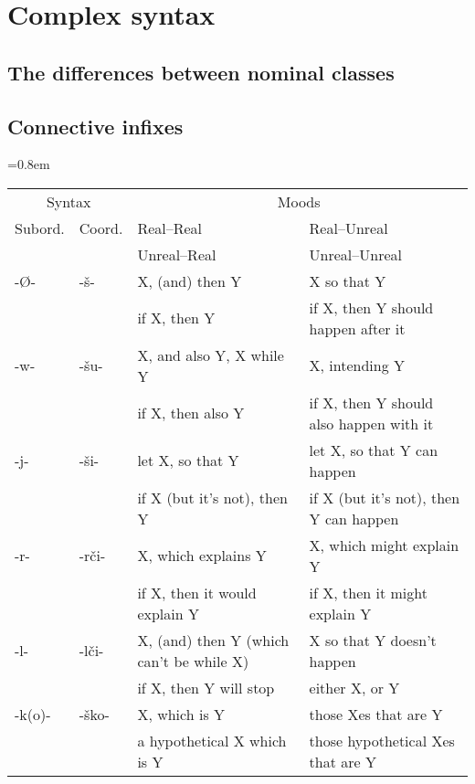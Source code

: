 \chapter{Complex syntax}
\section{The differences between nominal classes}
\section{Connective infixes}
\begingroup
\tabcolsep=0.8em
\begin{tabular}{@{\hskip 0.5em}llll@{\hskip 0.5em}}
  \toprule
  \multicolumn{2}{c}{Syntax} & \multicolumn{2}{c}{Moods} \\
  \cmidrule(r){1-2} \cmidrule(l){3-4}
  Subord. & Coord.
  & Real--Real & Real--Unreal \\&
  & Unreal--Real & Unreal--Unreal \\\midrule

  -Ø- & -\v{s}-
  & X, (and) then Y
  & X so that Y \\&
  & if X, then Y
  & if X, then Y should happen after it \\[0.6em]

  -w- & -\v{s}u-
  & X, and also Y, X while Y
  & X, intending Y \\&
  & if X, then also Y
  & if X, then Y should also happen with it \\[0.6em]

  -j- & -\v{s}i-
  & let X, so that Y
  & let X, so that Y can happen \\&
  & if X (but it's not), then Y
  & if X (but it's not), then Y can happen \\[0.6em]

  -r- & -r\v{c}i-
  & X, which explains Y
  & X, which might explain Y \\&
  & if X, then it would explain Y
  & if X, then it might explain Y \\[0.6em]

  -l- & -l\v{c}i-
  & X, (and) then Y (which can't be while X)
  & X so that Y doesn't happen \\&
  & if X, then Y will stop
  & either X, or Y \\[0.6em]

  -k(o)- & -\v{s}ko-
  & X, which is Y
  & those Xes that are Y \\&
  & a hypothetical X which is Y
  & those hypothetical Xes that are Y \\
  \bottomrule
\end{tabular}
\endgroup

